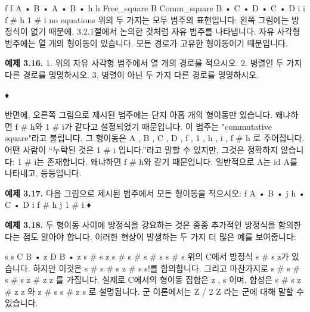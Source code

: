 \documentclass[11pt, a4paper, twoside, openany]{book}
\begin{document}
{\par\medskip
f
f
A •
B •
A •
B •
h
h
Free\_square B
Comm\_square B
•
C
•
D
•
C
•
D
i
i
f \# h  1 \# i
no equations
위의 두 가지는 모두 범주의 표현입니다: 왼쪽 그림에는 방정식이 없기 때문에, 3.2.1\hspace{0pt}절에서 논의한 것처럼 자유 범주를 나타냅니다. 자유 사각형 범주에는 열 개의 형이동이 있습니다. 모든 경로가 고유한 형이동이기 때문입니다.

\par\medskip
\textbf{예제 3.16.}
1. 위의 자유 사각형 범주에서 열 개의 경로를 적으시오.
2. 병렬인 두 가지 다른 경로를 명명하시오.
3. 병렬이 아닌 두 가지 다른 경로를 명명하시오.

\par\medskip
♦

\par\medskip
반면에, 오른쪽 그림으로 제시된 범주에는 단지 아홉 개의 형이동만 있습니다. 왜냐하면 f \# h\hspace{0pt}와 1 \# i\hspace{0pt}가 같다고 설정되었기 때문입니다. 이 범주는 "commutative square"라고 불립니다. 그 형이동은
{ A , B , C , D , f , 1 , h , i , f \# h }
로 주어집니다. 어떤 사람이 “누락된 것은 1 \# i 입니다.”라고 말할 수 있지만, 그것은 정확하지 않습니다: 1 \# i\hspace{0pt}는 존재합니다. 왜냐하면 f \# h\hspace{0pt}와 같기 때문입니다. 일반적으로 A\hspace{0pt}는 id A\hspace{0pt}를 나타내고, 등등입니다.

\par\medskip
\textbf{예제 3.17.} 다음 그림으로 제시된 범주에서 모든 형이동을 적으시오:
f
A •
B •
j
h
•
C
•
D
i
f \# h  j  1 \# i
♦

\par\medskip
\textbf{예제 3.18.} 두 형이동 사이에 방정식을 강요하는 것은 종종 추가적인 방정식을 함의한다는 점도 알아야 합니다. 이러한 현상이 발생하는 두 가지 더 많은 예를 보여줍니다:

\par\medskip
s
s
C B
•
z
D B
•
z
s \# s  z
s \# s \# s \# s  s \# s
위의 C\hspace{0pt}에서 방정식 s \# s  z\hspace{0pt}가 있습니다. 하지만 이것은 s \# s \# s  z \# s  s!를 함의합니다. 그리고 마찬가지로 s \# s \# s \# s  z \# z  z 를 가집니다. 실제로 C\hspace{0pt}에서의 형이동 집합은 { z , s }이며, 합성은 s \# s  z \# z  z 와 z \# s  s \# z  s 로 설명됩니다. 군 이론에서는 Z / 2 Z 라는 군에 대해 말할 수 있습니다.

}
\end{document}
